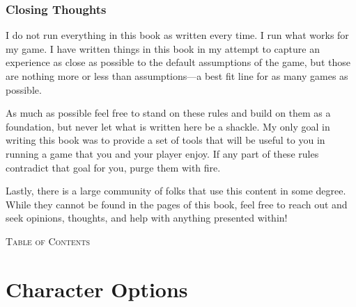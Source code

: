 \documentclass[11pt,twoside,openany]{book}  %
\begin{document}
\section*{Closing Thoughts}
I do not run everything in this book as written every time. I run what works for my game. I have written things in this book in my attempt to capture an experience as close as possible to the default assumptions of the game, but those are nothing more or less than assumptions—a best fit line for as many games as possible.

As much as possible feel free to stand on these rules and build on them as a foundation, but never let what is written here be a shackle. My only goal in writing this book was to provide a set of tools that will be useful to you in running a game that you and your player enjoy. If any part of these rules contradict that goal for you, purge them with fire.

Lastly, there is a large community of folks that use this content in some degree. While they cannot be found in the pages of this book, feel free to reach out and seek opinions, thoughts, and help with anything presented within!


\clearpage
\onecolumn

{}
\markboth{}{}
\renewcommand{\contentsname}{} %

\vspace*{1.5em}
{\centering
  {\color{DndRed}\scshape\Huge Table of Contents\par}
  \vspace{2em}
}

\tableofcontents

\twocolumn





\mainmatter
{}


\part{Character Options}
\end{document}
